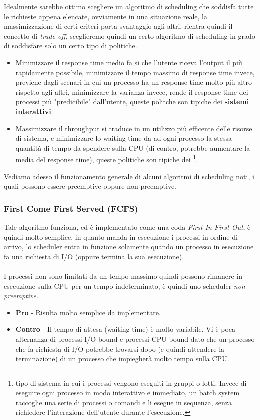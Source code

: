 \documentclass[12pt, letterpaper]{article}
\newcommand{\acc}{\\\hphantom{}\\}
\begin{document}
Idealmente sarebbe ottimo scegliere un algoritmo di scheduling che soddisfa 
tutte le richieste appena elencate, ovviamente in una situazione reale, la 
massimizzazione di certi criteri porta svantaggio agli altri, rientra 
quindi il concetto di \textit{trade-off}, sceglieremo quindi un certo 
algoritmo di scheduling in grado di soddisfare solo un certo tipo di 
politiche.\begin{itemize}
    \item Minimizzare il response time medio fa si che l'utente 
    riceva l'output il più rapidamente possibile, minimizzare il tempo massimo 
    di response time invece, previene dagli scenari in cui un processo 
    ha un response time molto più altro rispetto agli altri, minimizzare 
    la varianza invece, rende il response time dei processi più "predicibile" 
    dall'utente, queste politche son tipiche dei \textbf{sistemi interattivi}.
    \item Massimizzare il throughput si traduce in un utilizzo più efficente 
    delle risorse di sistema, e minimizzare lo waiting time da ad ogni processo 
    la stessa quantità di tempo da spendere sulla CPU (di contro, potrebbe 
    aumentare la media del response time), queste politiche son tipiche 
    dei \footnote{
        tipo di sistema in cui i processi vengono eseguiti  in gruppi o lotti. Invece di eseguire ogni processo in modo interattivo e immediato, un batch system raccoglie una serie di processi o comandi e li esegue in sequenza, senza richiedere l’interazione dell’utente durante l’esecuzione.
    }.
\end{itemize}
Vediamo adesso il funzionamento generale di alcuni algoritmi di scheduling noti,
i quali possono essere preemptive oppure non-preemptive.
\subsubsection{First Come First Served (FCFS)}
Tale algoritmo funziona, ed è implementato come una coda 
\textit{First-In-First-Out}, è quindi molto semplice, in quanto manda 
in esecuzione i processi in ordine di arrivo, lo scheduler entra in funzione 
solamente quando un processo in esecuzione fa una richiesta 
di I/O (oppure termina la sua esecuzione).\acc I processi non sono limitati 
da un tempo massimo quindi possono rimanere in esecuzione sulla CPU 
per un tempo indeterminato, è quindi uno scheduler \textit{non-preemptive}. 
\begin{itemize}
    \item \textbf{Pro} - Risulta molto semplice da implementare.
    \item \textbf{Contro} - Il tempo di attesa (waiting time) è molto 
    variabile. Vi è poca alternanza di processi I/O-bound e processi 
    CPU-bound dato che un processo che fa richiesta di I/O potrebbe trovarsi 
    dopo (e quindi attendere la terminazione) di un processo che 
    impiegherà molto tempo sulla CPU.
\end{itemize}
\end{document}
